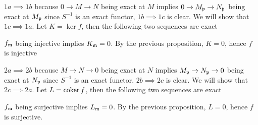 \begin{longproof}
	$1a \implies 1b$ because $0 \to M \to N$ being exact at $M$ implies $0 \to M_{\mathfrak{p}} \to N_{\mathfrak{p}}$ being exact at $M_{\mathfrak{p}}$ since $S^{-1}$ is an exact functor, $1b \implies 1c$ is clear. We will show that $1c \implies 1a$. Let $K = \ker f$, then the following two sequences are exact
	\begin{center}
	\end{center}
	
	$f_{\mathfrak{m}}$ being injective implies $K_{\mathfrak{m}} = 0$. By the previous proposition, $K = 0$, hence $f$ is injective
	
	$2a \implies 2b$ because $M \to N \to 0$ being exact at $N$ implies $M_{\mathfrak{p}} \to N_{\mathfrak{p}} \to 0$ being exact at $N_{\mathfrak{p}}$ since $S^{-1}$ is an exact functor. $2b \implies 2c$ is clear. We will show that $2c \implies 2a$. Let $L = \operatorname{coker} f$, then the following two sequences are exact
	\begin{center}
	\end{center}
	
	$f_{\mathfrak{m}}$ being surjective implies $L_{\mathfrak{m}} = 0$. By the previous proposition, $L = 0$, hence $f$ is surjective.
	
\end{longproof}


